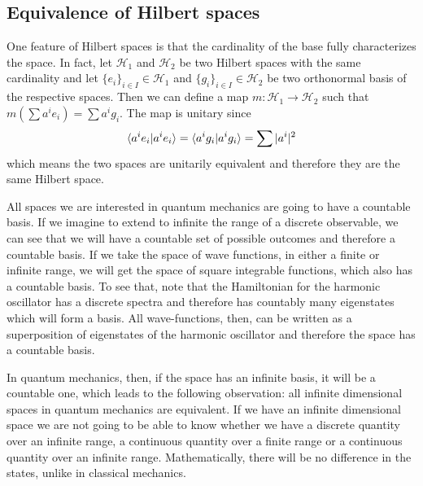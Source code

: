 \subsection{Equivalence of Hilbert spaces}

One feature of Hilbert spaces is that the cardinality of the base fully characterizes the space. In fact, let $\mathcal{H}_1$ and $\mathcal{H}_2$ be two Hilbert spaces with the same cardinality and let $\{e_i\}_{i \in I} \in \mathcal{H}_1$ and $\{g_i\}_{i \in I} \in \mathcal{H}_2$ be two orthonormal basis of the respective spaces. Then we can define a map $m : \mathcal{H}_1 \to \mathcal{H}_2$ such that $m(\sum a^i e_i) = \sum a^i g_i$. The map is unitary since
\begin{equation}
	\langle a^i e_i | a^i e_i\rangle = \langle a^i g_i | a^i g_i\rangle = \sum | a^i | ^2
\end{equation}
which means the two spaces are unitarily equivalent and therefore they are the same Hilbert space.

All spaces we are interested in quantum mechanics are going to have a countable basis. If we imagine to extend to infinite the range of a discrete observable, we can see that we will have a countable set of possible outcomes and therefore a countable basis. If we take the space of wave functions, in either a finite or infinite range, we will get the space of square integrable functions, which also has a countable basis. To see that, note that the Hamiltonian for the harmonic oscillator has a discrete spectra and therefore has countably many eigenstates which will form a basis. All wave-functions, then, can be written as a superposition of eigenstates of the harmonic oscillator and therefore the space has a countable basis.

In quantum mechanics, then, if the space has an infinite basis, it will be a countable one, which leads to the following observation: all infinite dimensional spaces in quantum mechanics are equivalent. If we have an infinite dimensional space we are not going to be able to know whether we have a discrete quantity over an infinite range, a continuous quantity over a finite range or a continuous quantity over an infinite range. Mathematically, there will be no difference in the states, unlike in classical mechanics.

